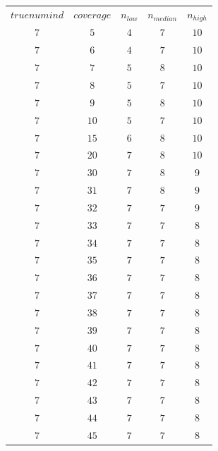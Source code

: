 \begin{table}[H]
\begin{tabular}{ccccc}
$truenumind$ & $coverage$ & $n_{low}$ & $n_{median}$ & $n_{high}$\\
$7$ & $5$ & $4$ & $7$ & $10$\\
$7$ & $6$ & $4$ & $7$ & $10$\\
$7$ & $7$ & $5$ & $8$ & $10$\\
$7$ & $8$ & $5$ & $7$ & $10$\\
$7$ & $9$ & $5$ & $8$ & $10$\\
$7$ & $10$ & $5$ & $7$ & $10$\\
$7$ & $15$ & $6$ & $8$ & $10$\\
$7$ & $20$ & $7$ & $8$ & $10$\\
$7$ & $30$ & $7$ & $8$ & $9$\\
$7$ & $31$ & $7$ & $8$ & $9$\\
$7$ & $32$ & $7$ & $7$ & $9$\\
$7$ & $33$ & $7$ & $7$ & $8$\\
$7$ & $34$ & $7$ & $7$ & $8$\\
$7$ & $35$ & $7$ & $7$ & $8$\\
$7$ & $36$ & $7$ & $7$ & $8$\\
$7$ & $37$ & $7$ & $7$ & $8$\\
$7$ & $38$ & $7$ & $7$ & $8$\\
$7$ & $39$ & $7$ & $7$ & $8$\\
$7$ & $40$ & $7$ & $7$ & $8$\\
$7$ & $41$ & $7$ & $7$ & $8$\\
$7$ & $42$ & $7$ & $7$ & $8$\\
$7$ & $43$ & $7$ & $7$ & $8$\\
$7$ & $44$ & $7$ & $7$ & $8$\\
$7$ & $45$ & $7$ & $7$ & $8$\\
\end{tabular}
\end{table}
 